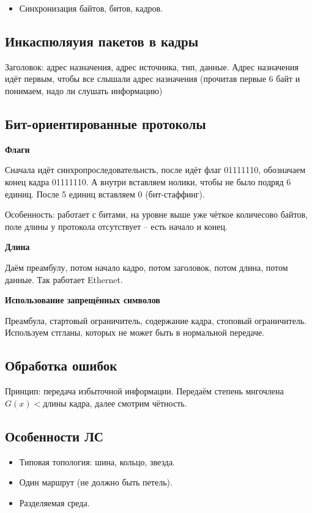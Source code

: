 \begin{itemize}
    \item Синхронизация байтов, битов, кадров.
\end{itemize}

\subsection{Инкаспюляуия пакетов в кадры}

Заголовок: адрес назначения, адрес источника, тип, данные. Адрес назначения идёт первым, чтобы все слышали адрес назначения (прочитав первые 6 байт и понимаем, надо ли слушать информацию)

\subsection{Бит-ориентированные протоколы}

\textbf{Флаги}

Сначала идёт синхропроследовательнсть, после идёт флаг 01111110, обозначаем конец кадра 01111110. А внутри вставляем нолики, чтобы не было подряд 6 единиц. После 5 единиц вставляем 0 (бит-стаффинг).

Особенность: работает с битами, на уровне выше уже чёткое количесово байтов, поле длины у протокола отсутствует – есть начало и конец.

\textbf{Длина}

Даём преамбулу, потом начало кадро, потом заголовок, потом длина, потом данные. Так работает Ethernet.

\textbf{Использование запрещённых символов}

Преамбула, стартовый ограничитель, содержание кадра, стоповый ограничитель.
Используем стгланы, которых не может быть в нормальной передаче.

\subsection{Обработка ошибок}

Принцип: передача избыточной информации. Передаём степень мнгочлена $G(x) < \text{длины кадра}$, далее смотрим чётность.

\subsection{Особенности ЛС}

\begin{itemize}
    \item Типовая топология: шина, кольцо, звезда.
    \item Один маршрут (не должно быть петель).
    \item Разделяемая среда.
\end{itemize}

